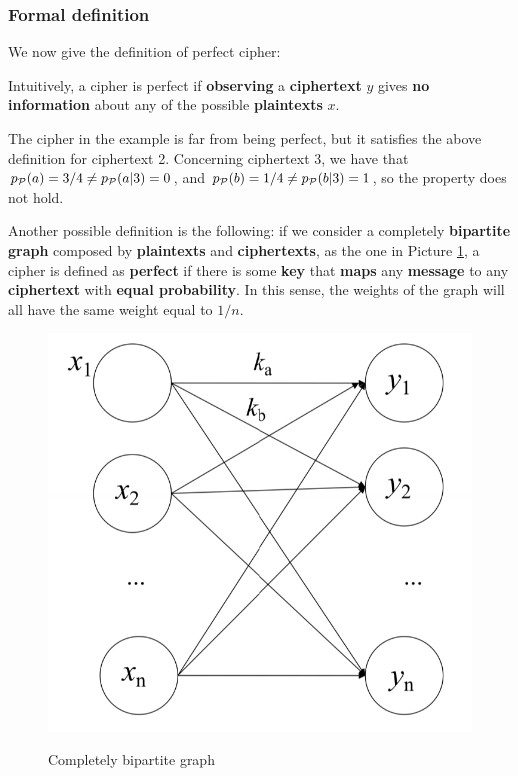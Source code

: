 \subsubsection{Formal definition}
We now give the definition of perfect cipher:


Intuitively, a cipher is perfect if \textbf{observing} a \textbf{ciphertext} $y$ gives \textbf{no information} about any of the possible \textbf{plaintexts} $x$. 

The cipher in the example is far from being perfect, but it satisfies the above definition for ciphertext 2. Concerning ciphertext 3, we have that $p_{\cal P}(a) = 3/4 \neq p_{\cal P}(a|3) = 0$, and $p_{\cal P}(b) = 1/4 \neq p_{\cal P}(b|3) = 1$, so the property does not hold.

Another possible definition is the following: if we consider a completely \textbf{bipartite graph} composed by \textbf{plaintexts} and \textbf{ciphertexts}, as the one in Picture \ref{perfect1}, a cipher is defined as \textbf{perfect} if there is some \textbf{key} that \textbf{maps} any \textbf{message} to any \textbf{ciphertext} with \textbf{equal probability}. In this sense, the weights of the graph will all have the same weight equal to $1/n$. 

\begin{figure}[h!]
        \centering
        \includegraphics[scale = 0.65]{img/perfect1.png}
        \label{perfect1}
        \caption{Completely bipartite graph}
\end{figure}

